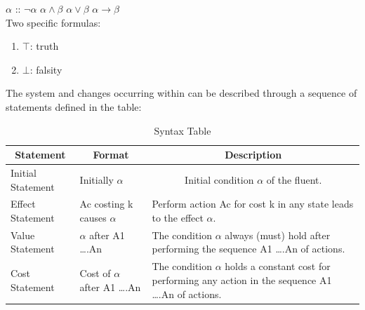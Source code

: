 \documentclass[11pt]{article}
\begin{document}
	$\alpha$ :: $\neg\alpha$ \textbar $\alpha\wedge\beta$ \textbar $\alpha\vee\beta$ \textbar $\alpha\rightarrow\beta$\\
	Two specific formulas:
	\begin{enumerate}
	\item $\top$: truth
	\item $\bot$: falsity
	\end{enumerate}
	The system and changes occurring within can be described through a sequence of statements defined in the table:
	\begin{table}[htbp]
  \centering
    \begin{tabular}{|p{4cm}|p{4cm}|p{7cm}|}
    \hline
    \multicolumn{1}{|c|}{Statement} & \multicolumn{1}{c|}{Format} & \multicolumn{1}{c|}{Description} \\
    \hline
    Initial Statement & Initially $\alpha$ & \multicolumn{1}{c|}{Initial condition $\alpha$ of the fluent.} \\
    \hline
    Effect Statement & Ac costing k causes $\alpha$ & Perform action Ac for cost k in any state leads to the effect $\alpha$. \\
    \hline
    Value Statement & $\alpha$ after A1 ….An & The condition $\alpha$ always (must) hold after performing the sequence A1 ….An of actions. \\
    \hline
    Cost Statement & Cost of $\alpha$ after A1 ….An & The condition $\alpha$ holds a constant cost  for performing any action in the sequence A1 ….An of actions. \\
    \hline
    \end{tabular}
    \caption{Syntax Table}
  \label{tab:table01}
\end{table}
\end{document}
